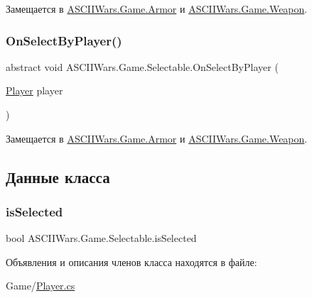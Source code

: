 Замещается в \hyperlink{class_a_s_c_i_i_wars_1_1_game_1_1_armor_af502379d334f2fc7901638f8a8eba130}{A\+S\+C\+I\+I\+Wars.\+Game.\+Armor} и \hyperlink{class_a_s_c_i_i_wars_1_1_game_1_1_weapon_aa03a588bfb93fbf63d4d7bf63ce62ae1}{A\+S\+C\+I\+I\+Wars.\+Game.\+Weapon}.

\hypertarget{class_a_s_c_i_i_wars_1_1_game_1_1_selectable_a95bdcf05ef9ea5f39c81ddd96294968a}{}\label{class_a_s_c_i_i_wars_1_1_game_1_1_selectable_a95bdcf05ef9ea5f39c81ddd96294968a} 
\subsubsection{\texorpdfstring{On\+Select\+By\+Player()}{OnSelectByPlayer()}}
{\footnotesize\ttfamily abstract void A\+S\+C\+I\+I\+Wars.\+Game.\+Selectable.\+On\+Select\+By\+Player (\begin{DoxyParamCaption}\item[{\hyperlink{class_a_s_c_i_i_wars_1_1_game_1_1_player}{Player}}]{player }\end{DoxyParamCaption})\hspace{0.3cm}{\ttfamily [pure virtual]}}



Замещается в \hyperlink{class_a_s_c_i_i_wars_1_1_game_1_1_armor_ab4f8a39af009eef4bbdeb6db67fb9cd5}{A\+S\+C\+I\+I\+Wars.\+Game.\+Armor} и \hyperlink{class_a_s_c_i_i_wars_1_1_game_1_1_weapon_a6cd549ad51fa64884a66b1083098465f}{A\+S\+C\+I\+I\+Wars.\+Game.\+Weapon}.



\subsection{Данные класса}
\hypertarget{class_a_s_c_i_i_wars_1_1_game_1_1_selectable_ad864445e5408f11f74f2e5c843677fb2}{}\label{class_a_s_c_i_i_wars_1_1_game_1_1_selectable_ad864445e5408f11f74f2e5c843677fb2} 
\subsubsection{\texorpdfstring{is\+Selected}{isSelected}}
{\footnotesize\ttfamily bool A\+S\+C\+I\+I\+Wars.\+Game.\+Selectable.\+is\+Selected}



Объявления и описания членов класса находятся в файле\+:\begin{DoxyCompactItemize}
\item 
Game/\hyperlink{_player_8cs}{Player.\+cs}\end{DoxyCompactItemize}
